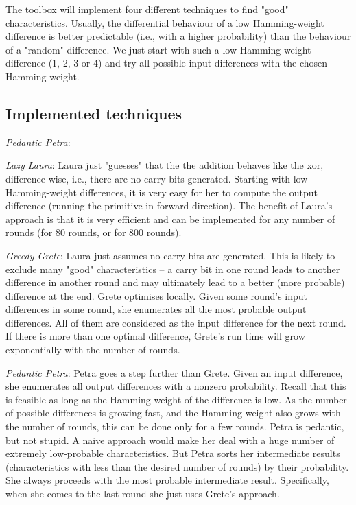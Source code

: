 \documentclass{acmtrans2m}
\begin{document}
The toolbox will implement four different techniques to find "good" 
characteristics. Usually, the differential behaviour of a low 
Hamming-weight difference is better predictable (i.e., with a higher 
probability) than the behaviour of a "random" difference. We just start
with such a low Hamming-weight difference (1, 2, 3 or 4) and try all
possible input differences with the chosen Hamming-weight.

\subsection{Implemented techniques}

\begin{describe}{{\em Pedantic Petra\/}:}
\item[{\em Lazy Laura\/}:]
Laura just "guesses" that the the addition behaves like the xor, 
difference-wise, i.e., there are no carry bits generated. Starting with 
low Hamming-weight differences, it is very easy for her to compute the 
output difference (running the primitive in forward direction). The 
benefit of Laura’s approach is that it is very efficient and can be 
implemented for any number of rounds (for 80 rounds, or for 800 rounds).
  
\item[{\em Greedy Grete\/}:]
Laura just assumes no carry bits are generated. This is likely to 
exclude many "good" characteristics – a carry bit in one round leads 
to another difference in another round and may ultimately lead to a 
better (more probable) difference at the end. Grete optimises locally. 
Given some round’s input differences in some round, she enumerates all 
the most probable output differences. All of them are considered as 
the input difference for the next round. If there is more than one 
optimal difference, Grete’s run time will grow exponentially with the 
number of rounds.

\item[{\em Pedantic Petra\/}:]
Petra goes a step further than Grete. Given an input difference, she 
enumerates all output differences with a nonzero probability. Recall 
that this is feasible as long as the Hamming-weight of the difference 
is low. As the number of possible differences is growing fast, and 
the Hamming-weight also grows with the number of rounds, this can be 
done only for a few rounds. Petra is pedantic, but not stupid. A naive 
approach would make her deal with a huge number of extremely 
low-probable characteristics. But Petra sorts her intermediate results 
(characteristics with less than the desired number of rounds) by 
their probability. She always proceeds with the most probable 
intermediate result. Specifically, when she comes to the last round 
she just uses Grete’s approach.


\end{describe}
\end{document}

